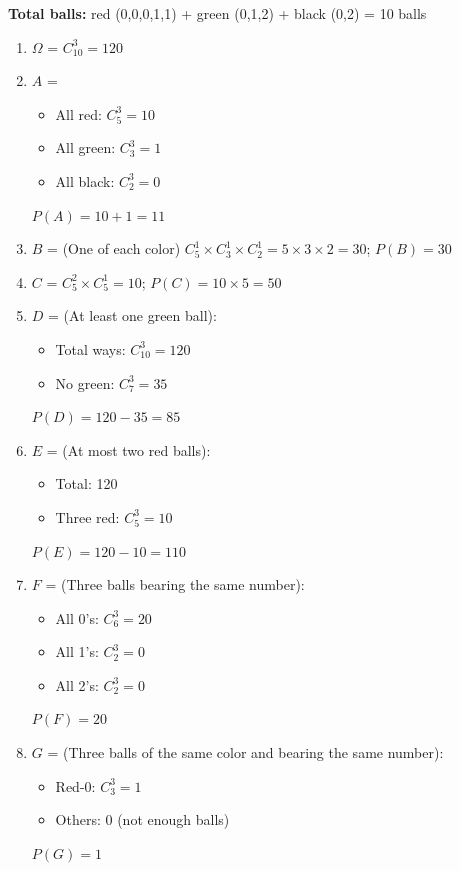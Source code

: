 \documentclass[12pt]{article}
\begin{document}
\begin{correctionbox}
\textbf{Total balls:} red (0,0,0,1,1) + green (0,1,2) + black (0,2) = 10 balls
\begin{enumerate}
    \item $\Omega$ = $C_{10}^3 = 120$
    
    \item $A$ = 
    \begin{itemize}
        \item All red: $C_5^3 = 10$
        \item All green: $C_3^3 = 1$
        \item All black: $C_2^3 = 0$ 
    \end{itemize}
    $P(A) = 10 + 1 = 11$

    \item $B$ = (One of each color) $C_5^1 \times C_3^1 \times C_2^1 = 5 \times 3 \times 2 = 30$; $P(B) = 30$

    \item $C$ = $C_5^2 \times C_5^1 = 10$; $P(C) = 10 \times 5 = 50$
    
    \item $D$ = (At least one green ball):
    \begin{itemize}
        \item Total ways: $C_{10}^3 = 120$
        \item No green: $C_7^3 = 35$
    \end{itemize}
    $P(D) = 120 - 35 = 85$
    
    \item $E$ = (At most two red balls):
    \begin{itemize}
        \item Total: 120
        \item Three red: $C_5^3 = 10$
    \end{itemize}
    $P(E) = 120 - 10 = 110$
    
    \item $F$ = (Three balls bearing the same number):
    \begin{itemize}
        \item All 0's: $C_6^3 = 20$
        \item All 1's: $C_2^3 = 0$ 
        \item All 2's: $C_2^3 = 0$ 
    \end{itemize}
    $P(F) = 20$
    
    \item $G$ = (Three balls of the same color and bearing the same number):
    \begin{itemize}
        \item Red-0: $C_3^3 = 1$
        \item Others: 0 (not enough balls)
    \end{itemize}
    $P(G) = 1$
    

\end{enumerate}
\end{correctionbox}
\end{document}
